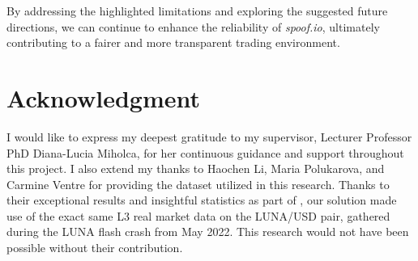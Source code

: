 \documentclass[conference]{IEEEtran}
\begin{document}
\par By addressing the highlighted limitations and exploring the suggested future directions, we can continue to enhance the reliability of \textit{spoof.io}, ultimately contributing to a fairer and more transparent trading environment.

\section*{Acknowledgment}
I would like to express my deepest gratitude to my supervisor, Lecturer Professor PhD Diana-Lucia Miholca, for her continuous guidance and support throughout this project.
I also extend my thanks to Haochen Li, Maria Polukarova, and Carmine Ventre for providing the dataset utilized in this research. Thanks to their exceptional results and insightful statistics as part of \cite{Li_2023}, our solution made use of the exact same L3 real market data on the LUNA/USD pair, gathered during the LUNA flash crash from May 2022. This research would not have been possible without their contribution.
\end{document}
